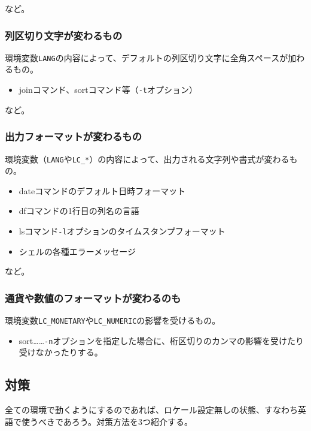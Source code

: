 \noindent
など。

\subsubsection*{列区切り文字が変わるもの}

環境変数\verb|LANG|の内容によって、デフォルトの列区切り文字に全角スペースが加わるもの。

\begin{itemize}
  \item joinコマンド、sortコマンド等（\verb|-t|オプション）
\end{itemize}

\noindent
など。

\subsubsection*{出力フォーマットが変わるもの}

環境変数（\verb|LANG|や\verb|LC_*|）の内容によって、出力される文字列や書式が変わるもの。

\begin{itemize}
  \item dateコマンドのデフォルト日時フォーマット
  \item dfコマンドの1行目の列名の言語
  \item lsコマンド\verb|-l|オプションのタイムスタンプフォーマット
  \item シェルの各種エラーメッセージ
\end{itemize}

\noindent
など。

\subsubsection*{通貨や数値のフォーマットが変わるのも}

環境変数\verb|LC_MONETARY|や\verb|LC_NUMERIC|の影響を受けるもの。

\begin{itemize}
  \item sort……\verb|-n|オプションを指定した場合に、桁区切りのカンマの影響を受けたり受けなかったりする。
\end{itemize}

\subsection*{対策}

全ての環境で動くようにするのであれば、ロケール設定無しの状態、すなわち英語で使うべきであろう。対策方法を3つ紹介する。

